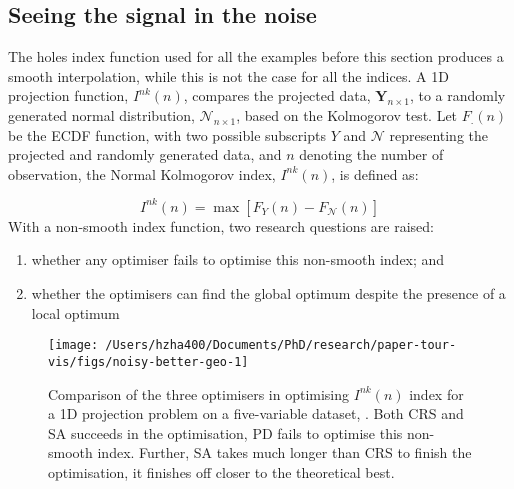 \hypertarget{seeing-the-signal-in-the-noise}{%
\subsection{Seeing the signal in the
noise}\label{seeing-the-signal-in-the-noise}}

The holes index function used for all the examples before this section
produces a smooth interpolation, while this is not the case for all the
indices. A 1D projection function, \(I^{nk}(n)\), compares the projected
data, \(\mathbf{Y}_{n \times 1}\), to a randomly generated normal
distribution, \(\mathcal{N}_{n \times 1}\), based on the Kolmogorov
test. Let \(F_{.}(n)\) be the ECDF function, with two possible
subscripts \(Y\) and \(\mathcal{N}\) representing the projected and
randomly generated data, and \(n\) denoting the number of observation,
the Normal Kolmogorov index, \(I^{nk}(n)\), is defined as:

\[I^{nk}(n) = \max \left[F_{Y}(n) - F_{\mathcal{N}}(n)\right]\] With a
non-smooth index function, two research questions are raised:

\begin{enumerate}
\def\labelenumi{\arabic{enumi})}
\tightlist
\item
  whether any optimiser fails to optimise this non-smooth index; and
\item
  whether the optimisers can find the global optimum despite the
  presence of a local optimum
\end{enumerate}

\begin{Schunk}
\begin{figure}

{\centering \texttt{[image: /Users/hzha400/Documents/PhD/research/paper-tour-vis/figs/noisy-better-geo-1]} 

}

\caption[Comparison of the three optimisers in optimising $I^{nk}(n)$ index for a 1D projection problem on a five-variable dataset, ]{Comparison of the three optimisers in optimising $I^{nk}(n)$ index for a 1D projection problem on a five-variable dataset, . Both CRS and SA succeeds in the optimisation, PD fails to optimise this non-smooth index. Further, SA takes  much longer than CRS to finish the optimisation, it finishes off closer to the theoretical best.}\label{fig:noisy-better-geo}
\end{figure}
\end{Schunk}

